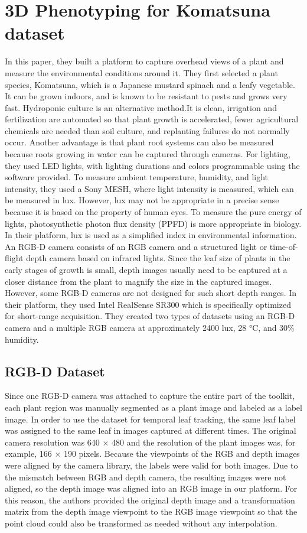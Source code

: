 \section{3D Phenotyping for Komatsuna dataset}
In this paper, they built a platform to capture overhead views of a plant and measure the environmental conditions around it. They first
selected a plant species, Komatsuna, which is a Japanese mustard spinach and a leafy vegetable. It can be grown indoors, and is known to
be resistant to pests and grows very fast. Hydroponic culture is an alternative method.It is clean, irrigation and fertilization are automated
so that plant growth is accelerated, fewer agricultural chemicals are needed than soil culture, and replanting failures do not normally occur.
Another advantage is that plant root systems can also be measured because roots growing in water can be captured through cameras. For lighting,
they used LED lights, with lighting durations and colors programmable using the software provided. To measure ambient temperature, humidity, and
light intensity, they used a Sony MESH, where light intensity is measured, which can be measured in lux. However, lux may not be appropriate in
a precise sense because it is based on the property of human eyes. To measure the pure energy of lights, photosynthetic photon flux density
(PPFD) is more appropriate in biology. In their platform, lux is used as a simplified index in environmental information. An RGB-D camera
consists of an RGB camera and a structured light or time-of-flight depth camera based on infrared lights. Since the leaf size of plants in the
early stages of growth is small, depth images usually need to be captured at a closer distance from the plant to magnify the size in the
captured images. However, some RGB-D cameras are not designed for such short depth ranges. In their platform, they used Intel RealSense SR300
which is specifically optimized for short-range acquisition.
They created two types of datasets using an RGB-D camera and a multiple RGB camera at approximately 2400 lux, 28 °C, and 30\% humidity.

\subsection{RGB-D Dataset}
Since one RGB-D camera was attached to capture the entire part of the toolkit, each plant region was manually segmented as a plant image
and labeled as a label image. In order to use the dataset for temporal leaf tracking, the same leaf label was assigned to the same leaf in
images captured at different times. The original camera resolution was 640 × 480 and the resolution of the plant images was, for example,
166 × 190 pixels. Because the viewpoints of the RGB and depth images were aligned by the camera library, the labels were valid for both images.
Due to the mismatch between RGB and depth camera, the resulting images were not aligned, so the depth image was aligned into an RGB image in our
platform. For this reason, the authors provided the original depth image and a transformation matrix from the depth image viewpoint to the RGB image
viewpoint so that the point cloud could also be transformed as needed without any interpolation.

